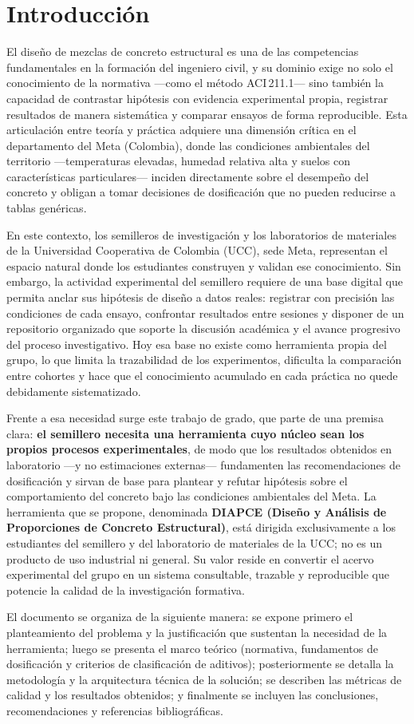 \section{Introducción}

El diseño de mezclas de concreto estructural es una de las competencias fundamentales en la formación del ingeniero civil, y su dominio exige no solo el conocimiento de la normativa —como el método ACI\,211.1— sino también la capacidad de contrastar hipótesis con evidencia experimental propia, registrar resultados de manera sistemática y comparar ensayos de forma reproducible. Esta articulación entre teoría y práctica adquiere una dimensión crítica en el departamento del Meta (Colombia), donde las condiciones ambientales del territorio —temperaturas elevadas, humedad relativa alta y suelos con características particulares— inciden directamente sobre el desempeño del concreto y obligan a tomar decisiones de dosificación que no pueden reducirse a tablas genéricas.

En este contexto, los semilleros de investigación y los laboratorios de materiales de la Universidad Cooperativa de Colombia (UCC), sede Meta, representan el espacio natural donde los estudiantes construyen y validan ese conocimiento. Sin embargo, la actividad experimental del semillero requiere de una base digital que permita anclar sus hipótesis de diseño a datos reales: registrar con precisión las condiciones de cada ensayo, confrontar resultados entre sesiones y disponer de un repositorio organizado que soporte la discusión académica y el avance progresivo del proceso investigativo. Hoy esa base no existe como herramienta propia del grupo, lo que limita la trazabilidad de los experimentos, dificulta la comparación entre cohortes y hace que el conocimiento acumulado en cada práctica no quede debidamente sistematizado.

Frente a esa necesidad surge este trabajo de grado, que parte de una premisa clara: \textbf{el semillero necesita una herramienta cuyo núcleo sean los propios procesos experimentales}, de modo que los resultados obtenidos en laboratorio —y no estimaciones externas— fundamenten las recomendaciones de dosificación y sirvan de base para plantear y refutar hipótesis sobre el comportamiento del concreto bajo las condiciones ambientales del Meta. La herramienta que se propone, denominada \textbf{DIAPCE (Diseño y Análisis de Proporciones de Concreto Estructural)}, está dirigida exclusivamente a los estudiantes del semillero y del laboratorio de materiales de la UCC; no es un producto de uso industrial ni general. Su valor reside en convertir el acervo experimental del grupo en un sistema consultable, trazable y reproducible que potencie la calidad de la investigación formativa.

El documento se organiza de la siguiente manera: se expone primero el planteamiento del problema y la justificación que sustentan la necesidad de la herramienta; luego se presenta el marco teórico (normativa, fundamentos de dosificación y criterios de clasificación de aditivos); posteriormente se detalla la metodología y la arquitectura técnica de la solución; se describen las métricas de calidad y los resultados obtenidos; y finalmente se incluyen las conclusiones, recomendaciones y referencias bibliográficas.
